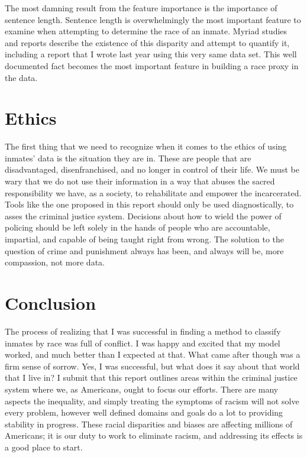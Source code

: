 \documentclass[11pt]{article}
\begin{document}
The most damning result from the feature importance is the importance of sentence length. Sentence length is overwhelmingly the most important feature to examine when attempting to determine the race of an inmate. Myriad studies\cite{disp} and reports\cite{sent} describe the existence of this disparity and attempt to quantify it, including a report that I wrote last year using this very same data set. This well documented fact becomes the most important feature in building a race proxy in the data.


\hypertarget{ethics}{%
\section{Ethics}\label{ethics}}
The first thing that we need to recognize when it comes to the ethics of using inmates' data is the situation they are in. These are people that are disadvantaged, disenfranchised, and no longer in control of their life. We must be wary that we do not use their information in a way that abuses the sacred responsibility we have, as a society, to rehabilitate and empower the incarcerated. Tools like the one proposed in this report should only be used diagnostically, to asses the criminal justice system. Decisions about how to wield the power of policing should be left solely in the hands of people who are accountable, impartial, and capable of being taught right from wrong. The solution to the question of crime and punishment always has been, and always will be, more compassion, not more data.

\hypertarget{conclusion}{%
\section{Conclusion}\label{conclusion}}
The process of realizing that I was successful in finding a method to classify inmates by race was full of conflict. I was happy and excited that my model worked, and much better than I expected at that. What came after though was a firm sense of sorrow. Yes, I was successful, but what does it say about that world that I live in? I submit that this report outlines areas within the criminal justice system where we, as Americans, ought to focus our efforts. There are many aspects the inequality, and simply treating the symptoms of racism will not solve every problem, however well defined domains and goals do a lot to providing stability in progress. These racial disparities and biases are affecting millions of Americans; it is our duty to work to eliminate racism, and addressing its effects is a good place to start.
\end{document}
